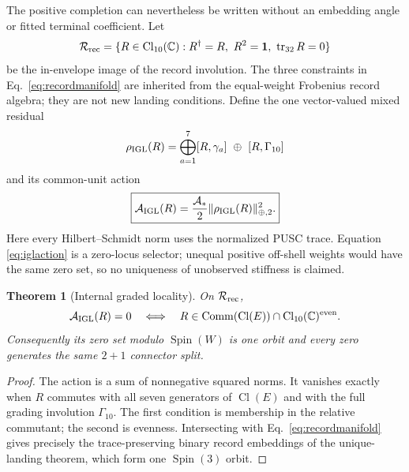 \documentclass[11pt,a4paper]{article}
\newtheorem{theorem}[definition]{Theorem}
\theoremstyle{remark}
\newcommand{\id}{\mathbf 1}
\begin{document}
The positive completion can nevertheless be written without an embedding
angle or fitted terminal coefficient.  Let
\begin{equation}
 \mathcal R_{\rm rec}
 =\{R\in\operatorname{Cl}_{10}(\mathbb C):
 R^\dagger=R,\ R^2=\id,\ \operatorname{tr}_{32}R=0\}
 \label{eq:recordmanifold}
\end{equation}
be the in-envelope image of the record involution.  The three constraints in
Eq.~\eqref{eq:recordmanifold} are inherited from the equal-weight Frobenius
record algebra; they are not new landing conditions.  Define the one
vector-valued mixed residual
\begin{equation}
 \rho_{\rm IGL}(R)
 =\bigoplus_{a=1}^{7}[R,\gamma_a]
  \ \oplus\ [R,\Gamma_{10}]
 \label{eq:iglresidual}
\end{equation}
and its common-unit action
\begin{equation}
 \boxed{
 \mathcal A_{\rm IGL}(R)
 =\frac{\mathcal A_*}{2}
   \|\rho_{\rm IGL}(R)\|_{\oplus,2}^{2}.}
 \label{eq:iglaction}
\end{equation}
Here every Hilbert--Schmidt norm uses the normalized PUSC trace.  Equation
\eqref{eq:iglaction} is a zero-locus selector; unequal positive off-shell
weights would have the same zero set, so no uniqueness of unobserved
stiffness is claimed.

\begin{theorem}[Internal graded locality]
On $\mathcal R_{\rm rec}$,
\begin{equation}
 \mathcal A_{\rm IGL}(R)=0
 \quad\Longleftrightarrow\quad
 R\in\operatorname{Comm}(\operatorname{Cl}(E))
       \cap\operatorname{Cl}_{10}(\mathbb C)^{\rm even}.
 \label{eq:iglzero}
\end{equation}
Consequently its zero set modulo $\operatorname{Spin}(W)$ is one orbit and
every zero generates the same $2+1$ connector split.
\end{theorem}

\begin{proof}
The action is a sum of nonnegative squared norms.  It vanishes exactly when
$R$ commutes with all seven generators of $\operatorname{Cl}(E)$ and with
the full grading involution $\Gamma_{10}$.  The first condition is membership
in the relative commutant; the second is evenness.  Intersecting with
Eq.~\eqref{eq:recordmanifold} gives precisely the trace-preserving binary
record embeddings of the unique-landing theorem, which form one
$\operatorname{Spin}(3)$ orbit.
\end{proof}
\end{document}
